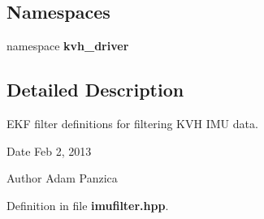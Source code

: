 \subsection*{\-Namespaces}
\begin{DoxyCompactItemize}
\item 
namespace {\bf kvh\-\_\-driver}
\end{DoxyCompactItemize}


\subsection{\-Detailed \-Description}
\-E\-K\-F filter definitions for filtering \-K\-V\-H \-I\-M\-U data. \begin{DoxyDate}{\-Date}
\-Feb 2, 2013 
\end{DoxyDate}
\begin{DoxyAuthor}{\-Author}
\-Adam \-Panzica 
\end{DoxyAuthor}


\-Definition in file {\bf imufilter.\-hpp}.

